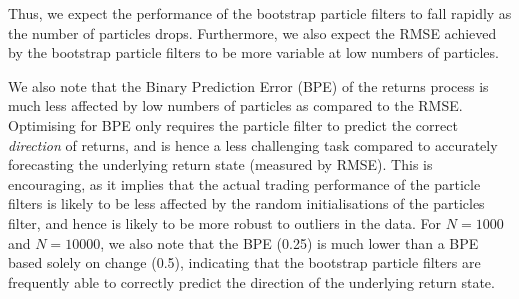 \documentclass[../main.tex]{subfiles}
\begin{document}
Thus, we expect the performance of the bootstrap particle filters to fall rapidly as the number of particles drops. Furthermore, we also expect the RMSE achieved by the bootstrap particle filters to be more variable at low numbers of particles. 

We also note that the Binary Prediction Error (BPE) of the returns process is much less affected by low numbers of particles as compared to the RMSE. Optimising for BPE only requires the particle filter to predict the correct \textit{direction} of returns, and is hence a less challenging task compared to accurately forecasting the underlying return state (measured by RMSE). This is encouraging, as it implies that the actual trading performance of the particle filters is likely to be less affected by the random initialisations of the particles filter, and hence is likely to be more robust to outliers in the data. For $N=1000$ and $N=10000$, we also note that the BPE (0.25) is much lower than a BPE based solely on change (0.5), indicating that the bootstrap particle filters are frequently able to correctly predict the direction of the underlying return state.
\end{document}
